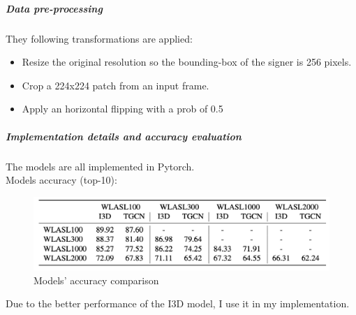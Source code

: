 \subparagraph{Data pre-processing} They following transformations are applied:
\begin{itemize}[noitemsep]
    \item Resize the original resolution so the bounding-box of the signer is 256 pixels.
    \item Crop a 224x224 patch from an input frame.
    \item Apply an horizontal flipping with a prob of 0.5
\end{itemize}

\subparagraph{Implementation details and accuracy evaluation} The models are all implemented in Pytorch. \\
Models accuracy (top-10): \\
\begin{figure}[H]
    \centering
        \includegraphics[width=1.0\textwidth]{assets/models_accuracy.png}
    \caption{Models' accuracy comparison}
    \label{fig:introduction_model_accuracy_comparison}
\end{figure}

Due to the better performance of the I3D model, I use it in my implementation.
